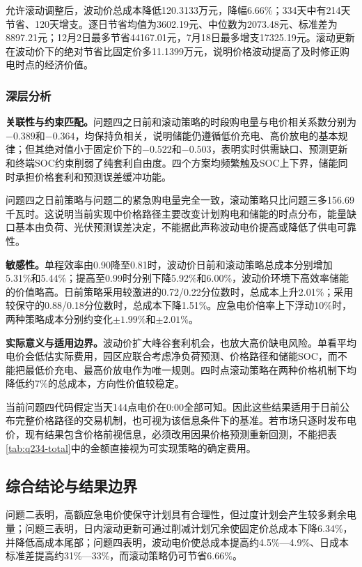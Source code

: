 \documentclass[UTF8,a4paper,12pt,fontset=fandol]{ctexart}
\numberwithin{equation}{section}
\begin{document}
允许滚动调整后，波动价总成本降低120.3133万元，降幅6.66\%；334天中有214天节省、120天增支。逐日节省均值为3602.19元、中位数为2073.48元、标准差为8897.21元；12月2日最多节省44167.01元，7月18日最多增支17325.19元。滚动更新在波动价下的绝对节省比固定价多11.1399万元，说明价格波动提高了及时修正购电时点的经济价值。

\subsubsection{深层分析}

\textbf{关联性与约束匹配。}问题四之日前和滚动策略的时段购电量与电价相关系数分别为$-0.389$和$-0.364$，均保持负相关，说明储能仍遵循低价充电、高价放电的基本规律；但其绝对值小于固定价下的$-0.522$和$-0.503$，表明实时供需缺口、预测更新和终端SOC约束削弱了纯套利自由度。四个方案均频繁触及SOC上下界，储能同时承担价格套利和预测误差缓冲功能。

问题四之日前策略与问题二的紧急购电量完全一致，滚动策略只比问题三多156.69千瓦时。这说明当前实现中价格路径主要改变计划购电和储能的时点分布，能量缺口基本由负荷、光伏预测误差决定，不能据此声称波动电价提高或降低了供电可靠性。

\textbf{敏感性。}单程效率由0.90降至0.81时，波动价日前和滚动策略总成本分别增加5.31\%和5.44\%；提高至0.99时分别下降5.92\%和6.00\%，波动价环境下高效率储能的价值略高。日前策略采用较激进的0.72/0.22分位数时，总成本上升2.01\%；采用较保守的0.88/0.18分位数时，总成本下降1.51\%。应急电价倍率上下浮动10\%时，两种策略成本分别约变化$\pm1.99\%$和$\pm2.01\%$。

\textbf{实际意义与适用边界。}波动价扩大峰谷套利机会，也放大高价缺电风险。单看平均电价会低估实际费用，园区应联合考虑净负荷预测、价格路径和储能SOC，而不能把最低价充电、最高价放电作为唯一规则。四时点滚动策略在两种价格机制下均降低约7\%的总成本，方向性价值较稳定。

当前问题四代码假定当天144点电价在0:00全部可知。因此这些结果适用于日前公布完整价格路径的交易机制，也可视为该信息条件下的基准。若市场只逐时发布电价，现有结果包含价格前视信息，必须改用因果价格预测重新回测，不能把表\ref{tab:q234-total}中的金额直接视为可实现策略的确定费用。

\subsection{综合结论与结果边界}

问题二表明，高额应急电价使保守计划具有合理性，但过度计划会产生较多剩余电量；问题三表明，日内滚动更新可通过削减计划冗余使固定价总成本下降6.34\%，并降低高成本尾部；问题四表明，波动电价使总成本提高约4.5\%---4.9\%、日成本标准差提高约31\%---33\%，而滚动策略仍可节省6.66\%。
\end{document}
